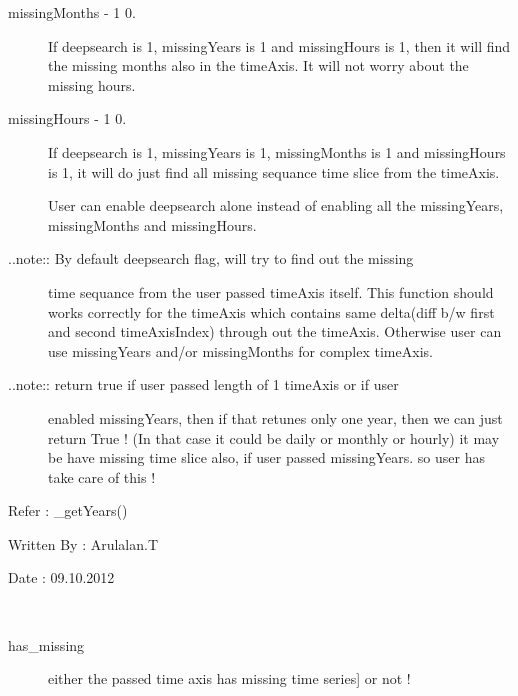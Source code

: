 \documentclass[letterpaper,10pt,english]{sphinxmanual}
\begin{document}
\begin{fulllineitems}
\begin{fulllineitems}
\begin{description}
\item[{missingMonths - 1 \textbar{} 0.}] \leavevmode
If deepsearch is 1, missingYears is 1 and missingHours is 1,
then it will find the missing months also in the timeAxis.
It will not worry about the missing hours.

\item[{missingHours - 1 \textbar{} 0.}] \leavevmode
If deepsearch is 1, missingYears is 1, missingMonths is 1
and missingHours is 1, it will do just find all missing
sequance time slice from the timeAxis.

User can enable deepsearch alone instead of enabling all the
missingYears, missingMonths and missingHours.

\item[{..note:: By default deepsearch flag, will try to find out the missing}] \leavevmode
time sequance from the user passed timeAxis itself.
This function should works correctly for the timeAxis which
contains same delta(diff b/w first and second timeAxisIndex)
through out the timeAxis. Otherwise user can use missingYears
and/or missingMonths for complex timeAxis.

\item[{..note:: return true if user passed length of 1 timeAxis or if user}] \leavevmode
enabled missingYears, then if that retunes only one year,
then we can just return True ! (In that case it could be
daily or monthly or hourly) it may be have missing time
slice also, if user passed missingYears. so user has take
care of this !

\end{description}

Refer : \_getYears()

Written By : Arulalan.T

Date : 09.10.2012

\end{fulllineitems}


\begin{fulllineitems}
\label{diagnosisutils:xml_data_access.TimeUtility.has_missing}~\begin{description}
\item[{has\_missing}] \leavevmode{[}either the passed time axis has missing time series{]}
or not !


\end{description}
\end{fulllineitems}
\end{fulllineitems}
\end{document}
